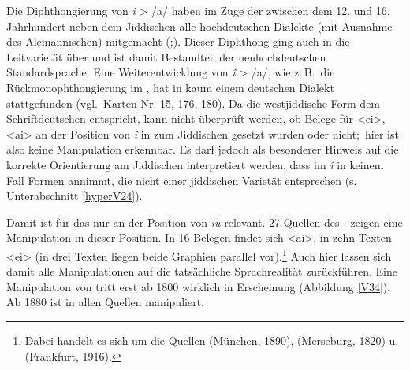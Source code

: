 Die Diphthongierung von {\mhd} \textit{î} > /a\textsubarch{\textsci}/ haben im Zuge der
 zwischen dem 12. und 16. Jahrhundert neben dem Jiddischen alle hochdeutschen Dialekte (mit Ausnahme des Alemannischen) mitgemacht (\citealt[146–149]{Koenig1978};\citealt[14–18]{Timm1987}). Dieser Diphthong ging auch in die Leitvarietät über und ist damit Bestandteil der neuhochdeutschen Standardsprache. Eine Weiterentwicklung von {\mhd} \textit{î} > /a\textsubarch{\textsci}/, wie z.\,B.\, die Rückmonophthongierung im \hai{{\ZOJ}}, hat in kaum einem deutschen Dialekt stattgefunden (vgl.\,  Karten Nr. 15, 176, 180). Da die westjiddische Form dem Schriftdeutschen entspricht, kann nicht überprüft werden, ob Belege für <ei>, <ai> an der Position von {\mhd} \textit{î} in  zum Jiddischen gesetzt wurden oder nicht;\, hier ist also keine Manipulation erkennbar. Es darf jedoch als besonderer Hinweis auf die korrekte Orientierung am Jiddischen interpretiert werden, dass im \hai{{\LiJi}} {\mhd} \textit{î} in keinem Fall Formen annimmt, die nicht einer jiddischen Varietät entsprechen (s. Unterabschnitt \ref{hyperV24}). 

Damit ist  für das \hai{{\LiJi}} nur an der Position von {\mhd} \textit{iu} relevant. 27 Quellen des - zeigen eine Manipulation in dieser Position. In 16 Belegen findet sich <ai>, in zehn Texten <ei> (in drei Texten liegen beide Graphien parallel vor).\footnote{Dabei handelt es sich um die Quellen  (München, 1890),  (Merseburg, 1820) u.  (Frankfurt, 1916).} Auch hier lassen sich damit alle Manipulationen auf die tatsächliche Sprachrealität zurückführen. Eine Manipulation von  tritt erst ab 1800 wirklich in Erscheinung (Abbildung \ref{V34}).  Ab 1880 ist  in allen Quellen manipuliert.
 
